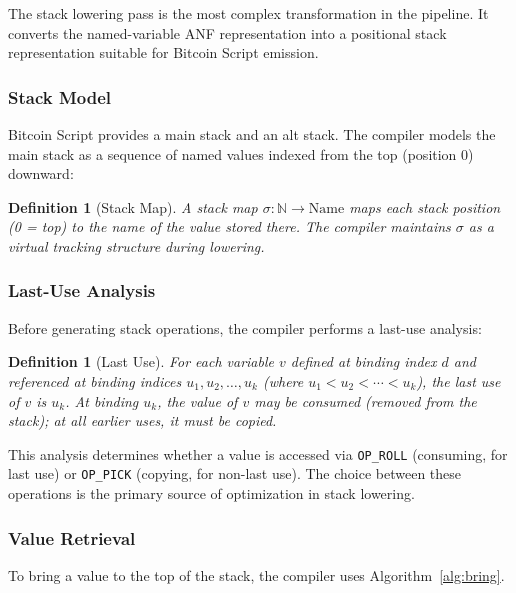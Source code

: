 \documentclass[11pt,a4paper]{article}
\newtheorem{definition}[theorem]{Definition}
\newcommand{\op}[1]{\texttt{OP\_#1}}
\begin{document}
The stack lowering pass is the most complex transformation in the pipeline.
It converts the named-variable ANF representation into a positional stack
representation suitable for Bitcoin Script emission.

\subsubsection{Stack Model}

Bitcoin Script provides a main stack and an alt stack. The compiler models
the main stack as a sequence of named values indexed from the top
(position 0) downward:

\begin{definition}[Stack Map]
A \emph{stack map} $\sigma : \mathbb{N} \to \text{Name}$ maps each stack
position (0 = top) to the name of the value stored there. The compiler
maintains $\sigma$ as a virtual tracking structure during lowering.
\end{definition}

\subsubsection{Last-Use Analysis}

Before generating stack operations, the compiler performs a last-use analysis:

\begin{definition}[Last Use]
For each variable $v$ defined at binding index $d$ and referenced at binding
indices $u_1, u_2, \ldots, u_k$ (where $u_1 < u_2 < \cdots < u_k$), the
\emph{last use} of $v$ is $u_k$. At binding $u_k$, the value of $v$ may be
consumed (removed from the stack); at all earlier uses, it must be copied.
\end{definition}

This analysis determines whether a value is accessed via \op{ROLL}
(consuming, for last use) or \op{PICK} (copying, for non-last use).
The choice between these operations is the primary source of optimization
in stack lowering.

\subsubsection{Value Retrieval}

To bring a value to the top of the stack, the compiler uses Algorithm~\ref{alg:bring}.
\end{document}
